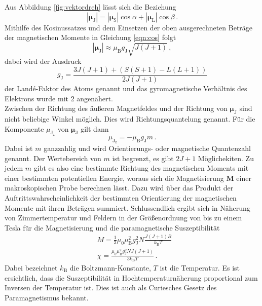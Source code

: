 Aus Abbildung \ref{fig:vektordreh} lässt sich die Beziehung
\begin{equation}
  |\symbf{\mu}_{\text{J}}| = |\symbf{\mu}_{\text{S}}| \cos\alpha + |\symbf{\mu}_{\text{L}}| \cos\beta\,.
  \label{eqn:cos}
\end{equation}
Mithilfe des Kosinussatzes und dem Einsetzen der oben ausgerechneten Beträge der magnetischen Momente in Gleichung
\ref{eqn:cos} folgt
\begin{equation}
  |\symbf{\mu}_{\text{J}}| \approx \mu_{\text{B}} g_{\text{J}} \sqrt{J(J+1)}\,,
\end{equation}
dabei wird der Ausdruck
\begin{equation}
  g_{\text{J}} = \frac{3J(J+1) + (S(S+1)-L(L+1))}{2J(J+1)}
  \label{eqn:lande}
\end{equation}
der Landé-Faktor des Atoms genannt und das gyromagnetische Verhältnis des Elektrons wurde
mit 2 angenähert. \\
Zwischen der Richtung des äußeren Magnetfeldes und der Richtung von $\symbf{\mu}_{\text{J}}$
sind nicht beliebige Winkel möglich. Dies wird Richtungsquantelung genannt. Für die Komponente
$\mu_{\text{J}_{\text{z}}}$ von $\symbf{\mu}_{\text{J}}$ gilt dann
\begin{equation}
  \mu_{\text{J}_{\text{z}}} = - \mu_{\text{B}} g_{\text{J}} m\,.
\end{equation}
Dabei ist $m$ ganzzahlig und wird Orientierungs- oder magnetische Quantenzahl genannt.
Der Wertebereich von $m$ ist begrenzt, es gibt $2J+1$ Möglichekiten. Zu jedem $m$ gibt es also eine bestimmte Richtung
des magnetischen Moments mit einer bestimmten potentiellen Energie, woraus sich die
Magnetisierung $\symbf{M}$ einer makroskopischen Probe berechnen lässt.
Dazu wird über das Produkt der Auftrittswahrscheinlichkeit der bestimmten
Orientierung der magnetischen Momente mit ihren Beträgen summiert.
Schlussendlich ergibt sich in Näherung von Zimmertemperatur und Feldern in der Größenordnung
von bis zu einem Tesla für die Magnetisierung und die paramagnetische Suszeptibilität
\begin{align}
  &M = \frac{1}{3} \mu_0 \mu_{\text{B}}^2 g_{\text{J}}^2 N \frac{J(J+1)B}{k_\text{B}T} \,\\
  &\chi = \frac{\mu_0 \mu_{\text{B}}^2 g_{\text{J}}^2 N J (J+1)}{3 k_{\text{B}} T}\,.
  \label{eqn:theoriewert}
\end{align}
Dabei bezeichnet $k_\text{B}$ die Boltzmann-Konstante, $T$ ist die Temperatur.
Es ist ersichtlich, dass die Suszeptibilität in Hochtemperaturnäherung proportional
zum Inversen der Temperatur ist. Dies ist auch als Curiesches Gesetz des Paramagnetismus bekannt.

